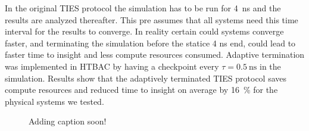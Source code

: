 In the original TIES protocol the simulation has to be run for
\SI{4}{\nano\second} and the results are analyzed thereafter. This pre assumes
that all systems need this time interval for the results to converge. In reality
certain could systems converge faster, and terminating the simulation before the
statice 4 ns end, could lead to faster time to insight and less compute
resources consumed. Adaptive termination was implemented in HTBAC by having a
checkpoint every $\tau = \SI{0.5}{\nano\second}$ in the simulation. Results show
that the adaptively terminated TIES protocol saves compute resources and reduced
time to insight on average by \SI{16}{\percent} for the physical systems we
tested.

\begin{figure}
  
  \caption{Adding caption soon!}
  \label{fig:termination}
\end{figure}


